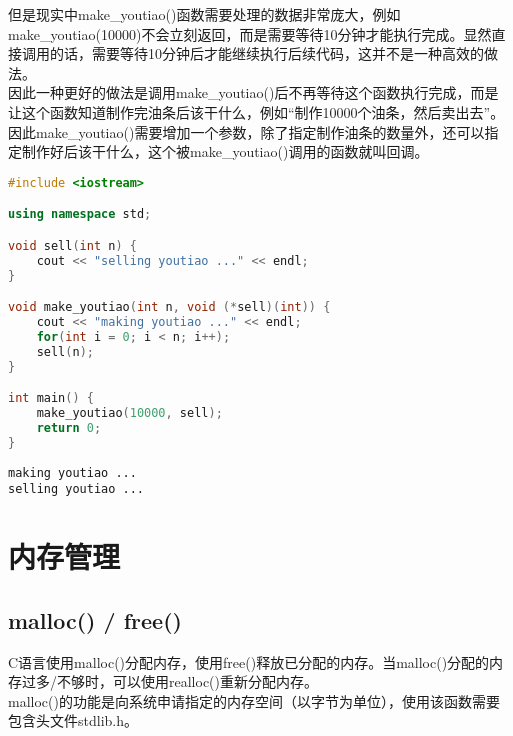 但是现实中make\_youtiao()函数需要处理的数据非常庞大，例如make\_youtiao(10000)不会立刻返回，而是需要等待10分钟才能执行完成。显然直接调用的话，需要等待10分钟后才能继续执行后续代码，这并不是一种高效的做法。 \\

因此一种更好的做法是调用make\_youtiao()后不再等待这个函数执行完成，而是让这个函数知道制作完油条后该干什么，例如“制作10000个油条，然后卖出去”。 \\

因此make\_youtiao()需要增加一个参数，除了指定制作油条的数量外，还可以指定制作好后该干什么，这个被make\_youtiao()调用的函数就叫回调。 \\


\begin{lstlisting}[language=C++]
#include <iostream>

using namespace std;

void sell(int n) {
    cout << "selling youtiao ..." << endl;
}

void make_youtiao(int n, void (*sell)(int)) {
    cout << "making youtiao ..." << endl;
    for(int i = 0; i < n; i++);
    sell(n);
}

int main() {
    make_youtiao(10000, sell);
    return 0;
}
\end{lstlisting}

\begin{tcolorbox}
	\begin{verbatim}
making youtiao ...
selling youtiao ...
	\end{verbatim}
\end{tcolorbox}

\newpage

\section{内存管理}

\subsection{malloc() / free()}

C语言使用malloc()分配内存，使用free()释放已分配的内存。当malloc()分配的内存过多/不够时，可以使用realloc()重新分配内存。 \\

malloc()的功能是向系统申请指定的内存空间（以字节为单位），使用该函数需要包含头文件stdlib.h。

\vspace{-0.5cm}

